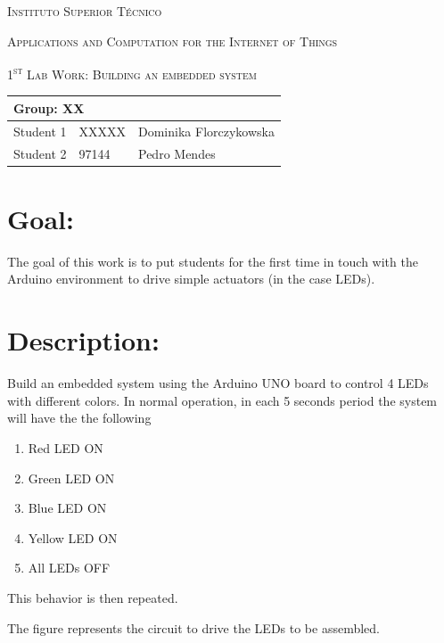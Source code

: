 \documentclass[10pt]{article}
\begin{document}
\begin{center}
    {\scshape Instituto Superior Técnico\par}
    \vspace{1cm}
    {\scshape\Large Applications and Computation for the Internet of Things\par}
    \vspace{1.5cm}
\end{center}
{\scshape\LARGE 1\textsuperscript{st} Lab Work: Building an embedded system}
\\
\begin{table}[h!]
    \centering
    \begin{tabular}{|l|l|p{10cm}|}
        \hline
        \multicolumn{3}{|l|}{Group: XX} \\[1.5ex] \hline
        Student 1 & XXXXX & Dominika Florczykowska \\ [1.5ex]\hline
        Student 2 & 97144 & Pedro Mendes \\ [1.5ex]\hline
    \end{tabular}
\end{table}

\section{Goal:}
The goal of this work is to put students for the first time in touch with the
Arduino environment to drive simple actuators (in the case LEDs).
\section{Description:}
Build an embedded system using the Arduino UNO board to control 4 LEDs with
different colors. In normal operation, in each 5 seconds period the system will
have the the following

\begin{enumerate}
    \item Red LED ON
    \item Green LED ON
    \item Blue LED ON
    \item Yellow LED ON
    \item All LEDs OFF
\end{enumerate}

This behavior is then repeated.

The figure represents the circuit to drive the LEDs to be assembled.
\end{document}
